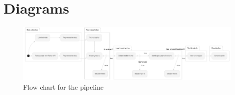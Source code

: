 \appendix
\chapter{Diagrams}\label{appendix:raw}
\begin{figure}
\begin{center}
  \includegraphics[angle=90, width=\dimexpr\textwidth-9cm\relax, height=\textheight, keepaspectratio]{./images/pipeline.png}
\end{center}
\caption{Flow chart for the pipeline}
\label{fig:flow_chart_big}
\end{figure}
